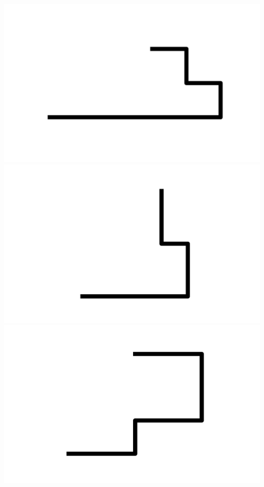 \documentclass[]{report}
\begin{document}
\includegraphics[scale=.1]{pictures/21/state_cluster_shapes_439.pdf} 
\includegraphics[scale=.1]{pictures/21/state_cluster_shapes_440.pdf} 
\includegraphics[scale=.1]{pictures/21/state_cluster_shapes_441.pdf} 
\end{document}

